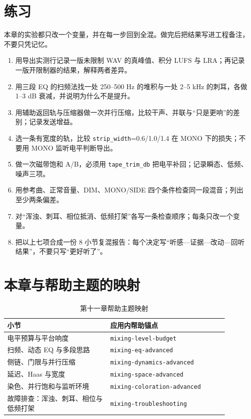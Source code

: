 \section{练习}


\begin{exercise}
本章的实验都只改一个变量，并在每一步回到全混。做完后把结果写进工程备注，不要只凭记忆。

\begin{enumerate}
  \item 用导出实测行记录一版未限制 WAV 的真峰值、积分 LUFS 与 LRA；再记录一版开限制器的结果，解释两者差异。
  \item 用三段 EQ 的扫频法找一处 250–500 Hz 的堆积与一处 2–5 kHz 的刺耳，各做 1–3 dB 衰减，并说明为什么不是提升。
  \item 用辅助返回轨与压缩器做一次并行压缩，比较干声、并联与“只是更响”的差别；记录发送增益。
  \item 选一条有宽度的轨，比较 \texttt{strip\_width}=0.6/1.0/1.4 在 MONO 下的损失；不要用 MONO 监听电平判断导出。
  \item 做一次磁带饱和 A/B，必须用 \texttt{tape\_trim\_db} 把电平补回；记录瞬态、低频、噪声三项。
  \item 用参考曲、正常音量、DIM、MONO/SIDE 四个条件检查同一段混音；列出至少两条偏差。
  \item 对“浑浊、刺耳、相位抵消、低频打架”各写一条检查顺序；每条只改一个变量。
  \item 把以上七项合成一份 8 小节复混报告：每个决定写“听感—证据—改动—回听结果”，不要只写“更好听了”。
\end{enumerate}
\end{exercise}

\section{本章与帮助主题的映射}

\begin{table}[htbp]
\centering
\small
\begin{tabular}{@{}p{0.42\linewidth}p{0.48\linewidth}@{}}
\hline
小节 & 应用内帮助锚点 \\
\hline
电平预算与平台响度 & \texttt{mixing-level-budget} \\
扫频、动态 EQ 与多段思路 & \texttt{mixing-eq-advanced} \\
侧链、门限与并行压缩 & \texttt{mixing-dynamics-advanced} \\
延迟、Haas 与宽度 & \texttt{mixing-space-advanced} \\
染色、并行饱和与监听环境 & \texttt{mixing-coloration-advanced} \\
故障排查：浑浊、刺耳、相位与低频打架 & \texttt{mixing-troubleshooting} \\
\hline
\end{tabular}
\caption{第十一章帮助主题映射}
\end{table}

